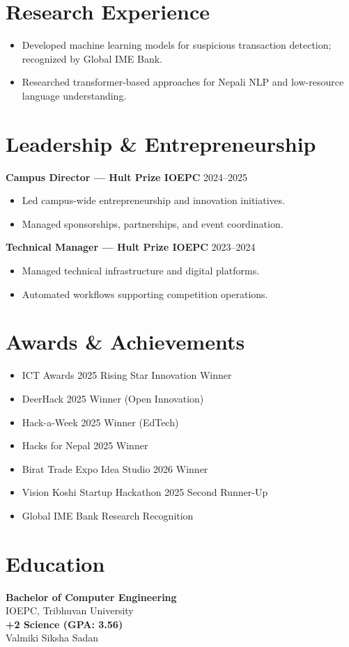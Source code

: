 \documentclass[11pt,a4paper]{article}
\begin{document}
\section*{Research Experience}

\begin{itemize}[leftmargin=*]
\item Developed machine learning models for suspicious transaction detection; recognized by Global IME Bank.
\item Researched transformer-based approaches for Nepali NLP and low-resource language understanding.
\end{itemize}

\section*{Leadership \& Entrepreneurship}

\textbf{Campus Director — Hult Prize IOEPC}
\hfill 2024--2025

\begin{itemize}[leftmargin=*]
    \item Led campus-wide entrepreneurship and innovation initiatives.
    \item Managed sponsorships, partnerships, and event coordination.
\end{itemize}

\textbf{Technical Manager — Hult Prize IOEPC}
\hfill 2023--2024

\begin{itemize}[leftmargin=*]
    \item Managed technical infrastructure and digital platforms.
    \item Automated workflows supporting competition operations.
\end{itemize}
\section*{Awards \& Achievements}

\begin{itemize}[leftmargin=*]
\item ICT Awards 2025 Rising Star Innovation Winner
\item DeerHack 2025 Winner (Open Innovation)
\item Hack-a-Week 2025 Winner (EdTech)
\item Hacks for Nepal 2025 Winner
\item Birat Trade Expo Idea Studio 2026 Winner
\item Vision Koshi Startup Hackathon 2025 Second Runner-Up
\item Global IME Bank Research Recognition
\end{itemize}

\section*{Education}

\textbf{Bachelor of Computer Engineering} \\
IOEPC, Tribhuvan University \\

\textbf{+2 Science (GPA: 3.56)}\\
Valmiki Siksha Sadan
\end{document}
